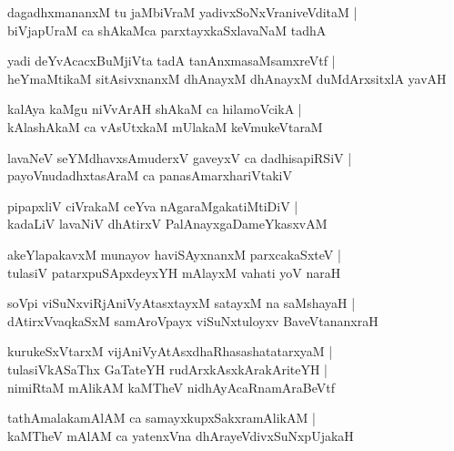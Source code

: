 \documentclass[twoside,12pt,openright]{book}
\newcounter{shloka}[chapter]
\begin{document}
\begin{shloka}%
dagadhxmananxM tu jaMbiVraM yadivxSoNxVraniveVditaM |\\
biVjapUraM ca shAkaMca parxtayxkaSxlavaNaM tadhA 
\end{shloka}

\begin{shloka}%
yadi deYvAcacxBuMjiVta tadA tanAnxmasaMsamxreVtf |\\
heYmaMtikaM sitAsivxnanxM dhAnayxM dhAnayxM duMdArxsitxlA yavAH 
\end{shloka}

\begin{shloka}%
kalAya kaMgu niVvArAH shAkaM ca hilamoVcikA |\\
kAlashAkaM ca vAsUtxkaM mUlakaM keVmukeVtaraM 
\end{shloka}

\begin{shloka}%
lavaNeV seYMdhavxsAmuderxV gaveyxV ca dadhisapiRSiV |\\
payoVnudadhxtasAraM ca panasAmarxhariVtakiV 
\end{shloka}

\begin{shloka}%
pipapxliV ciVrakaM ceYva nAgaraMgakatiMtiDiV |\\
kadaLiV lavaNiV dhAtirxV PalAnayxgaDameYkasxvAM
\end{shloka}

\begin{shloka}%
akeYlapakavxM munayov haviSAyxnanxM parxcakaSxteV |\\
tulasiV patarxpuSApxdeyxYH mAlayxM vahati yoV naraH
\end{shloka}

\begin{shloka}%
soVpi viSuNxviRjAniVyAtasxtayxM satayxM na saMshayaH |\\
dAtirxVvaqkaSxM samAroVpayx viSuNxtuloyxv BaveVtananxraH
\end{shloka}

\begin{shloka}%
kurukeSxVtarxM vijAniVyAtAsxdhaRhasashatatarxyaM |\\
tulasiVkASaThx GaTateYH rudArxkAsxkArakAriteYH |\\
nimiRtaM mAlikAM kaMTheV nidhAyAcaRnamAraBeVtf
\end{shloka}

\begin{shloka}%
tathAmalakamAlAM ca samayxkupxSakxramAlikAM |\\
kaMTheV mAlAM ca yatenxVna dhArayeVdivxSuNxpUjakaH 
\end{shloka}
\end{document}

